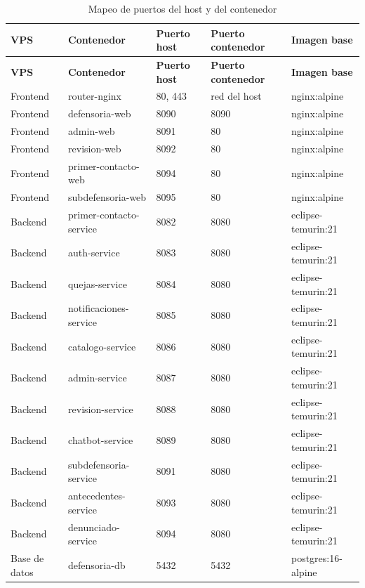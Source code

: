 {\small
\begin{longtable}{p{2.1cm}p{4.4cm}p{2.3cm}p{2.3cm}p{2.9cm}}
\caption{Mapeo de puertos del host y del contenedor}\\
\toprule
\textbf{VPS} & \textbf{Contenedor} & \textbf{Puerto host} & \textbf{Puerto contenedor} & \textbf{Imagen base} \\
\midrule
\endfirsthead
\toprule
\textbf{VPS} & \textbf{Contenedor} & \textbf{Puerto host} & \textbf{Puerto contenedor} & \textbf{Imagen base} \\
\midrule
\endhead
Frontend & router-nginx & 80, 443 & red del host & nginx:alpine \\
Frontend & defensoria-web & 8090 & 8090 & nginx:alpine \\
Frontend & admin-web & 8091 & 80 & nginx:alpine \\
Frontend & revision-web & 8092 & 80 & nginx:alpine \\
Frontend & primer-contacto-web & 8094 & 80 & nginx:alpine \\
Frontend & subdefensoria-web & 8095 & 80 & nginx:alpine \\
\midrule
Backend & primer-contacto-service & 8082 & 8080 & eclipse-temurin:21 \\
Backend & auth-service & 8083 & 8080 & eclipse-temurin:21 \\
Backend & quejas-service & 8084 & 8080 & eclipse-temurin:21 \\
Backend & notificaciones-service & 8085 & 8080 & eclipse-temurin:21 \\
Backend & catalogo-service & 8086 & 8080 & eclipse-temurin:21 \\
Backend & admin-service & 8087 & 8080 & eclipse-temurin:21 \\
Backend & revision-service & 8088 & 8080 & eclipse-temurin:21 \\
Backend & chatbot-service & 8089 & 8080 & eclipse-temurin:21 \\
Backend & subdefensoria-service & 8091 & 8080 & eclipse-temurin:21 \\
Backend & antecedentes-service & 8093 & 8080 & eclipse-temurin:21 \\
Backend & denunciado-service & 8094 & 8080 & eclipse-temurin:21 \\
\midrule
Base de datos & defensoria-db & 5432 & 5432 & postgres:16-alpine \\
\bottomrule
\end{longtable}}


